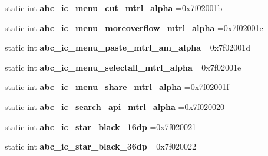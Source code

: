 \begin{DoxyCompactItemize}
static int {\bfseries abc\+\_\+ic\+\_\+menu\+\_\+cut\+\_\+mtrl\+\_\+alpha} =0x7f02001b
\item 
\mbox{\label{classandroid_1_1support_1_1graphics_1_1drawable_1_1R_1_1drawable_a3715cc135f36e833563a8a164e8da3a9}} 
static int {\bfseries abc\+\_\+ic\+\_\+menu\+\_\+moreoverflow\+\_\+mtrl\+\_\+alpha} =0x7f02001c
\item 
\mbox{\label{classandroid_1_1support_1_1graphics_1_1drawable_1_1R_1_1drawable_a1bcca28b9c8c1dbd581286b3d76c0131}} 
static int {\bfseries abc\+\_\+ic\+\_\+menu\+\_\+paste\+\_\+mtrl\+\_\+am\+\_\+alpha} =0x7f02001d
\item 
\mbox{\label{classandroid_1_1support_1_1graphics_1_1drawable_1_1R_1_1drawable_af369c0d47df6fcdb69aead3bd10cce56}} 
static int {\bfseries abc\+\_\+ic\+\_\+menu\+\_\+selectall\+\_\+mtrl\+\_\+alpha} =0x7f02001e
\item 
\mbox{\label{classandroid_1_1support_1_1graphics_1_1drawable_1_1R_1_1drawable_a8ebd2fadad07844a4572e7f45c85b228}} 
static int {\bfseries abc\+\_\+ic\+\_\+menu\+\_\+share\+\_\+mtrl\+\_\+alpha} =0x7f02001f
\item 
\mbox{\label{classandroid_1_1support_1_1graphics_1_1drawable_1_1R_1_1drawable_aa84cf5a986817ed4f5af337a60fdfe7d}} 
static int {\bfseries abc\+\_\+ic\+\_\+search\+\_\+api\+\_\+mtrl\+\_\+alpha} =0x7f020020
\item 
\mbox{\label{classandroid_1_1support_1_1graphics_1_1drawable_1_1R_1_1drawable_a7a6eb1037c41336f1aa9c57511a0ad61}} 
static int {\bfseries abc\+\_\+ic\+\_\+star\+\_\+black\+\_\+16dp} =0x7f020021
\item 
\mbox{\label{classandroid_1_1support_1_1graphics_1_1drawable_1_1R_1_1drawable_a71241ac37429fa684d12872a05861f9c}} 
static int {\bfseries abc\+\_\+ic\+\_\+star\+\_\+black\+\_\+36dp} =0x7f020022

\end{DoxyCompactItemize}

